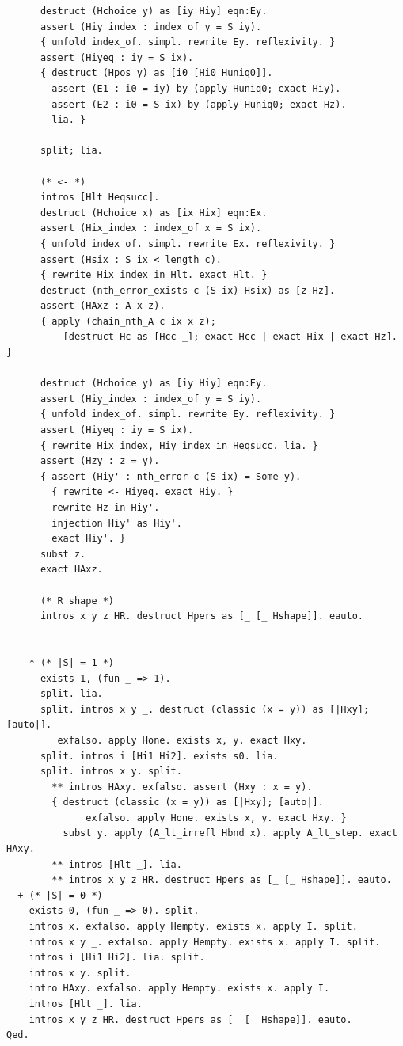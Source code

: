 \begin{latin}
\begin{verbatim}
      destruct (Hchoice y) as [iy Hiy] eqn:Ey.
      assert (Hiy_index : index_of y = S iy).
      { unfold index_of. simpl. rewrite Ey. reflexivity. }
      assert (Hiyeq : iy = S ix).
      { destruct (Hpos y) as [i0 [Hi0 Huniq0]].
        assert (E1 : i0 = iy) by (apply Huniq0; exact Hiy).
        assert (E2 : i0 = S ix) by (apply Huniq0; exact Hz).
        lia. }

      split; lia.

      (* <- *)
      intros [Hlt Heqsucc].
      destruct (Hchoice x) as [ix Hix] eqn:Ex.
      assert (Hix_index : index_of x = S ix).
      { unfold index_of. simpl. rewrite Ex. reflexivity. }
      assert (Hsix : S ix < length c).
      { rewrite Hix_index in Hlt. exact Hlt. }
      destruct (nth_error_exists c (S ix) Hsix) as [z Hz].
      assert (HAxz : A x z).
      { apply (chain_nth_A c ix x z);
          [destruct Hc as [Hcc _]; exact Hcc | exact Hix | exact Hz]. }

      destruct (Hchoice y) as [iy Hiy] eqn:Ey.
      assert (Hiy_index : index_of y = S iy).
      { unfold index_of. simpl. rewrite Ey. reflexivity. }
      assert (Hiyeq : iy = S ix).
      { rewrite Hix_index, Hiy_index in Heqsucc. lia. }
      assert (Hzy : z = y).
      { assert (Hiy' : nth_error c (S ix) = Some y).
        { rewrite <- Hiyeq. exact Hiy. }
        rewrite Hz in Hiy'.
        injection Hiy' as Hiy'.
        exact Hiy'. }
      subst z.
      exact HAxz.

      (* R shape *)
      intros x y z HR. destruct Hpers as [_ [_ Hshape]]. eauto.


    * (* |S| = 1 *)
      exists 1, (fun _ => 1). 
      split. lia.
      split. intros x y _. destruct (classic (x = y)) as [|Hxy]; [auto|].
         exfalso. apply Hone. exists x, y. exact Hxy. 
      split. intros i [Hi1 Hi2]. exists s0. lia.
      split. intros x y. split. 
        ** intros HAxy. exfalso. assert (Hxy : x = y). 
        { destruct (classic (x = y)) as [|Hxy]; [auto|]. 
              exfalso. apply Hone. exists x, y. exact Hxy. }
          subst y. apply (A_lt_irrefl Hbnd x). apply A_lt_step. exact HAxy.
        ** intros [Hlt _]. lia.
        ** intros x y z HR. destruct Hpers as [_ [_ Hshape]]. eauto.
  + (* |S| = 0 *)
    exists 0, (fun _ => 0). split. 
    intros x. exfalso. apply Hempty. exists x. apply I. split. 
    intros x y _. exfalso. apply Hempty. exists x. apply I. split. 
    intros i [Hi1 Hi2]. lia. split. 
    intros x y. split. 
    intro HAxy. exfalso. apply Hempty. exists x. apply I. 
    intros [Hlt _]. lia.
    intros x y z HR. destruct Hpers as [_ [_ Hshape]]. eauto.
Qed.


\end{verbatim}
\end{latin}
